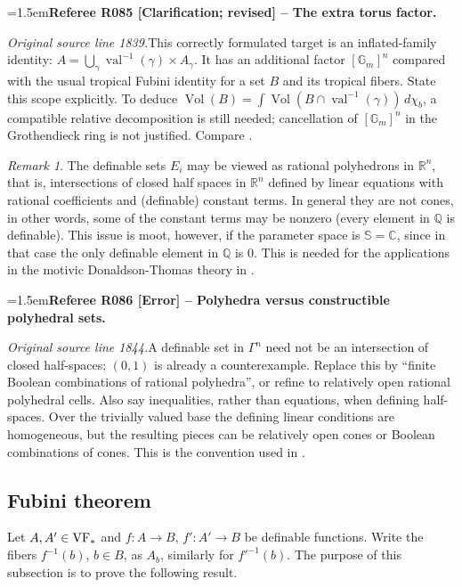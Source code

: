 \documentclass[12pt]{amsart}
\newcommand{\RefereeRemark}[4]{%
  \par\medskip\begingroup\normalfont\small\color{RefereePurple}%
  \emergencystretch=1.5em\noindent\textbf{Referee R#1 [#2] -- #3.}\par\nobreak\noindent #4\par
  \endgroup\medskip
}
\theoremstyle{plain}
\theoremstyle{definition}
\theoremstyle{remark}
\newtheorem{rem}[thm]{Remark}
\numberwithin{equation}{section}
\theoremstyle{plain}
\newcommand{\VF}{\textup{VF}}
\newcommand{\C}{\mathds{C}}
\newcommand{\Q}{\mathds{Q}}
\newcommand{\R}{\mathds{R}}
\newcommand{\0}{\emptyset}
\newcommand{\fun}{\longrightarrow}
\DeclareMathOperator{\vv}{val}
\begin{document}
\RefereeRemark{085}{Clarification; revised}{The extra torus factor}{%
\textit{Original source line 1839.}\quad This correctly formulated target is an inflated-family identity: $A=\bigcup_\gamma\vv^{-1}(\gamma)\times A_\gamma$. It has an additional factor $[\mathbb G_m]^n$ compared with the usual tropical Fubini identity for a set $B$ and its tropical fibers. State this scope explicitly. To deduce $\operatorname{Vol}(B)=\int\operatorname{Vol}(B\cap\vv^{-1}(\gamma))\,d\chi_b$, a compatible relative decomposition is still needed; cancellation of $[\mathbb G_m]^n$ in the Grothendieck ring is not justified. Compare \cite[Theorem~3.1.3]{Nic:Pay:trop:fub}.
}


\begin{rem}
The definable sets $E_i$ may be viewed as rational polyhedrons in $\R^n$, that is, intersections of closed half spaces in $\R^n$ defined by linear equations with rational coefficients and (definable) constant terms. In general they are not cones, in other words, some of the constant terms may be nonzero (every element in $\Q$ is definable). This issue is moot, however, if the parameter space is $\mathbb{S} = \C$, since in that case the only definable element in $\Q$ is $0$. This is needed for the applications in the motivic Donaldson-Thomas theory in  \cite{Nic:Pay:trop:fub}.
\end{rem}

\RefereeRemark{086}{Error}{Polyhedra versus constructible polyhedral sets}{%
\textit{Original source line 1844.}\quad A definable set in $\Gamma^n$ need not be an intersection of closed half-spaces; $(0,1)$ is already a counterexample. Replace this by ``finite Boolean combinations of rational polyhedra'', or refine to relatively open rational polyhedral cells. Also say inequalities, rather than equations, when defining half-spaces. Over the trivially valued base the defining linear conditions are homogeneous, but the resulting pieces can be relatively open cones or Boolean combinations of cones. This is the convention used in \cite[\S~2.2]{Nic:Pay:trop:fub}.
}


\subsection{Fubini theorem}
Let $A, A' \in \VF_*$ and $f : A \fun B$, $f': A' \fun B$ be definable functions. Write the fibers $f^{-1}(b)$, $b \in B$, as $A_b$, similarly for $f'^{-1}(b)$. The purpose of this subsection is to prove the following result.
\end{document}
